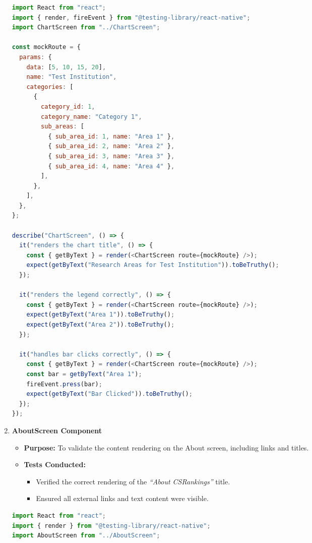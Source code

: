\documentclass[12pt]{article}
\begin{document}
\begin{enumerate}
\begin{lstlisting}[language=JavaScript, caption={ChartScreen Tests}, label={lst:ChartScreen}]
import React from "react";
import { render, fireEvent } from "@testing-library/react-native";
import ChartScreen from "../ChartScreen";

const mockRoute = {
  params: {
    data: [5, 10, 15, 20],
    name: "Test Institution",
    categories: [
      {
        category_id: 1,
        category_name: "Category 1",
        sub_areas: [
          { sub_area_id: 1, name: "Area 1" },
          { sub_area_id: 2, name: "Area 2" },
          { sub_area_id: 3, name: "Area 3" },
          { sub_area_id: 4, name: "Area 4" },
        ],
      },
    ],
  },
};

describe("ChartScreen", () => {
  it("renders the chart title", () => {
    const { getByText } = render(<ChartScreen route={mockRoute} />);
    expect(getByText("Research Areas for Test Institution")).toBeTruthy();
  });

  it("renders the legend correctly", () => {
    const { getByText } = render(<ChartScreen route={mockRoute} />);
    expect(getByText("Area 1")).toBeTruthy();
    expect(getByText("Area 2")).toBeTruthy();
  });

  it("handles bar clicks correctly", () => {
    const { getByText } = render(<ChartScreen route={mockRoute} />);
    const bar = getByText("Area 1");
    fireEvent.press(bar);
    expect(getByText("Bar Clicked")).toBeTruthy();
  });
});
\end{lstlisting}

    \item \textbf{AboutScreen Component}
    \begin{itemize}
        \item \textbf{Purpose:} To validate the content rendering on the About screen, including links and titles.
        \item \textbf{Tests Conducted:}
        \begin{itemize}
            \item Verified the correct rendering of the \textit{``About CSRankings''} title.
            \item Ensured all external links and text content were visible.
        \end{itemize}
    \end{itemize}

\begin{lstlisting}[language=JavaScript, caption={AboutScreen Tests}, label={lst:AboutScreen}]
import React from "react";
import { render } from "@testing-library/react-native";
import AboutScreen from "../AboutScreen";


\end{lstlisting}
\end{enumerate}
\end{document}
